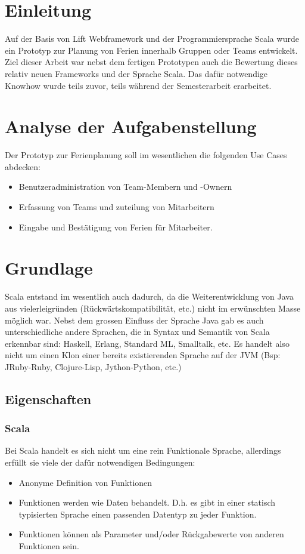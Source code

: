 \section{Einleitung}
Auf der Basis von Lift Webframework und der Programmiersprache Scala wurde ein Prototyp zur Planung von Ferien innerhalb Gruppen oder Teams entwickelt. Ziel dieser Arbeit war nebst dem fertigen Prototypen auch die Bewertung dieses relativ neuen Frameworks und der Sprache Scala. Das daf\"ur notwendige Knowhow wurde teils zuvor, teils w\"ahrend der Semesterarbeit erarbeitet. 

\section{Analyse der Aufgabenstellung}
Der Prototyp zur Ferienplanung soll im wesentlichen die folgenden Use Cases abdecken:
\begin{itemize}
\item Benutzeradministration von Team-Membern und -Ownern
\item Erfassung von Teams und zuteilung von Mitarbeitern
\item Eingabe und Best\"atigung von Ferien f\"ur Mitarbeiter.
\end{itemize}

\section{Grundlage}
Scala entstand im wesentlich auch dadurch, da die Weiterentwicklung von Java aus vielerleigr\"unden (R\"uckw\"artskompatibilit\"at, etc.) nicht im erw\"unschten Masse m\"oglich war. Nebst dem grossen Einfluss der Sprache Java gab es auch unterschiedliche andere Sprachen, die in Syntax und Semantik von Scala erkennbar sind: Haskell, Erlang, Standard ML, Smalltalk, etc. Es handelt also nicht um einen Klon einer bereits existierenden Sprache auf der JVM (Bsp: JRuby-Ruby, Clojure-Lisp, Jython-Python, etc.)

\subsection{Eigenschaften}
\subsubsection{Scala}
Bei Scala handelt es sich nicht um eine rein Funktionale Sprache, allerdings erf\"ullt sie viele der daf\"ur notwendigen Bedingungen:
\begin{itemize}
\item Anonyme Definition von Funktionen
\item Funktionen werden wie Daten behandelt. D.h. es gibt in einer statisch typisierten Sprache einen passenden Datentyp zu jeder Funktion.
\item Funktionen k\"onnen als Parameter und/oder R\"uckgabewerte von anderen Funktionen sein.
\end{itemize}

